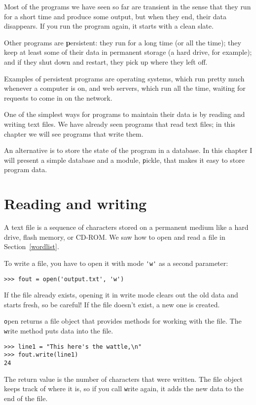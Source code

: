 \documentclass[
DIV=11,
fontsize=13,
twoside,
headinclude=false,
titlepage=firstiscover,
abstract=true,
headsepline=true,
footsepline=true,
chapterprefix=true, %
headings=big,
bibliography=totoc,%
captions=tableheading
]{scrbook}
\theoremstyle{definition}
\begin{document}
Most of the programs we have seen so far are transient in the
sense that they run for a short time and produce some output,
but when they end, their data disappears.  If you run the program
again, it starts with a clean slate.

Other programs are {\textbf persistent}: they run for a long time
(or all the time); they keep at least some of their data
in permanent storage (a hard drive, for example); and
if they shut down and restart, they pick up where they left off.

Examples of persistent programs are operating systems, which
run pretty much whenever a computer is on, and web servers,
which run all the time, waiting for requests to come in on
the network.

One of the simplest ways for programs to maintain their data
is by reading and writing text files.  We have already seen
programs that read text files; in this chapter we will see programs
that write them.

An alternative is to store the state of the program in a database.
In this chapter I will present a simple database and a module,
{\texttt pickle}, that makes it easy to store program data.


\section{Reading and writing}

A text file is a sequence of characters stored on a permanent
medium like a hard drive, flash memory, or CD-ROM.  We saw how
to open and read a file in Section~\ref{wordlist}.

To write a file, you have to open it with mode \verb"'w'" as a second
parameter:

\begin{lstlisting}
>>> fout = open('output.txt', 'w')
\end{lstlisting}
%
If the file already exists, opening it in write mode clears out
the old data and starts fresh, so be careful!
If the file doesn't exist, a new one is created.

{\texttt open} returns a file object that provides methods for working
with the file.
The {\texttt write} method puts data into the file.

\begin{lstlisting}
>>> line1 = "This here's the wattle,\n"
>>> fout.write(line1)
24
\end{lstlisting}
%
The return value is the number of characters that were written.
The file object keeps track of where it is, so if
you call {\texttt write} again, it adds the new data to the end of
the file.
\end{document}
